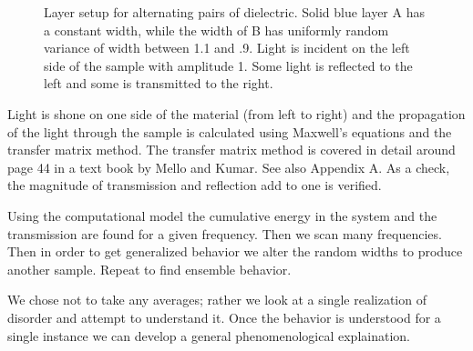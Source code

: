 \begin{figure}
\vskip -0.5cm
\centerline{}
\vskip -0.5cm
\caption[Layer setup for alternating pairs of dielectric.]{Layer setup for alternating pairs of dielectric. %
Solid blue layer A has a constant width, while the width of B has uniformly random variance of width between 1.1 and .9.  Light is incident on the left side of the sample with amplitude 1. Some light is reflected to the left and some is transmitted to the right.}
\label{fig:dimaSetup}
\end{figure}

Light is shone on one side of the material (from left to right) and the propagation of the light through the sample is calculated using Maxwell's equations and the transfer matrix method. The transfer matrix method is covered in detail around page 44 in a text book by Mello and Kumar\cite{2004_Mello_Kumar_book}. See also Appendix A.
As a check, the magnitude of transmission and reflection add to one is verified.

Using the computational model the cumulative energy in the system and the transmission are found for a given frequency. Then we scan many frequencies. Then in order to get generalized behavior we alter the random widths to produce another sample. Repeat to find ensemble behavior. 

We chose not to take any averages; rather we look at a single realization of disorder and attempt to understand it. Once the behavior is understood for a single instance we can develop a general phenomenological explaination.

